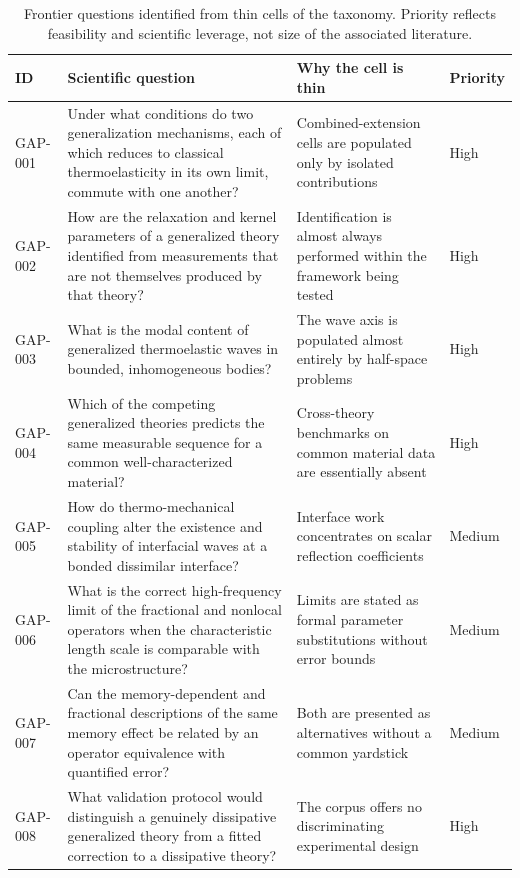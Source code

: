 \begin{table}[h]
\centering
\small
\caption{Frontier questions identified from thin cells of the taxonomy. Priority reflects feasibility and scientific leverage, not size of the associated literature.}
\label{tab:taxonomy_gaps}
\begin{tabularx}{\textwidth}{@{}lXXl@{}}
\toprule
\textbf{ID} & \textbf{Scientific question} & \textbf{Why the cell is thin} & \textbf{Priority} \\
\midrule
GAP-001 & Under what conditions do two generalization mechanisms, each of which reduces to classical thermoelasticity in its own limit, commute with one another? & Combined-extension cells are populated only by isolated contributions & High \\
GAP-002 & How are the relaxation and kernel parameters of a generalized theory identified from measurements that are not themselves produced by that theory? & Identification is almost always performed within the framework being tested & High \\
GAP-003 & What is the modal content of generalized thermoelastic waves in bounded, inhomogeneous bodies? & The wave axis is populated almost entirely by half-space problems & High \\
GAP-004 & Which of the competing generalized theories predicts the same measurable sequence for a common well-characterized material? & Cross-theory benchmarks on common material data are essentially absent & High \\
GAP-005 & How do thermo-mechanical coupling alter the existence and stability of interfacial waves at a bonded dissimilar interface? & Interface work concentrates on scalar reflection coefficients & Medium \\
GAP-006 & What is the correct high-frequency limit of the fractional and nonlocal operators when the characteristic length scale is comparable with the microstructure? & Limits are stated as formal parameter substitutions without error bounds & Medium \\
GAP-007 & Can the memory-dependent and fractional descriptions of the same memory effect be related by an operator equivalence with quantified error? & Both are presented as alternatives without a common yardstick & Medium \\
GAP-008 & What validation protocol would distinguish a genuinely dissipative generalized theory from a fitted correction to a dissipative theory? & The corpus offers no discriminating experimental design & High \\
\bottomrule
\end{tabularx}
\end{table}


